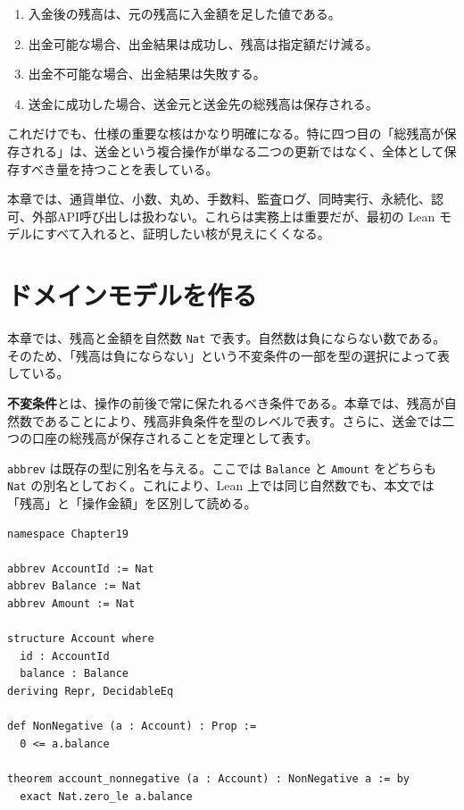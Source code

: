 \begin{enumerate}
\item 入金後の残高は、元の残高に入金額を足した値である。
\item 出金可能な場合、出金結果は成功し、残高は指定額だけ減る。
\item 出金不可能な場合、出金結果は失敗する。
\item 送金に成功した場合、送金元と送金先の総残高は保存される。
\end{enumerate}

これだけでも、仕様の重要な核はかなり明確になる。特に四つ目の「総残高が保存される」は、送金という複合操作が単なる二つの更新ではなく、全体として保存すべき量を持つことを表している。

\begin{warningbox}
本章では、通貨単位、小数、丸め、手数料、監査ログ、同時実行、永続化、認可、外部API呼び出しは扱わない。これらは実務上は重要だが、最初の Lean モデルにすべて入れると、証明したい核が見えにくくなる。
\end{warningbox}

\section{ドメインモデルを作る}

本章では、残高と金額を自然数 \texttt{Nat} で表す。自然数は負にならない数である。そのため、「残高は負にならない」という不変条件の一部を型の選択によって表している。

\begin{definitionbox}
\textbf{不変条件}とは、操作の前後で常に保たれるべき条件である。本章では、残高が自然数であることにより、残高非負条件を型のレベルで表す。さらに、送金では二つの口座の総残高が保存されることを定理として表す。
\end{definitionbox}

\begin{leanbox}
\texttt{abbrev} は既存の型に別名を与える。ここでは \texttt{Balance} と \texttt{Amount} をどちらも \texttt{Nat} の別名としておく。これにより、Lean 上では同じ自然数でも、本文では「残高」と「操作金額」を区別して読める。
\end{leanbox}

\begin{listing}[htbp]
\begin{verbatim}
namespace Chapter19

abbrev AccountId := Nat
abbrev Balance := Nat
abbrev Amount := Nat

structure Account where
  id : AccountId
  balance : Balance
deriving Repr, DecidableEq

def NonNegative (a : Account) : Prop :=
  0 <= a.balance

theorem account_nonnegative (a : Account) : NonNegative a := by
  exact Nat.zero_le a.balance
\end{verbatim}
\caption{口座操作の最小ドメインモデル}
\label{lst:ch19-domain-model}
\end{listing}

